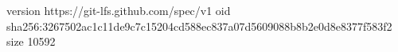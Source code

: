 version https://git-lfs.github.com/spec/v1
oid sha256:3267502ac1c11de9c7c15204cd588ec837a07d5609088b8b2e0d8e8377f583f2
size 10592
